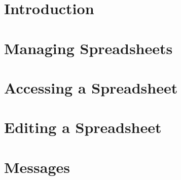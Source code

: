 \documentclass[twoside,a4paper]{refart}
\title{\thetitle}
\author{
        Vijay Bajracharya   \\
        Nick Hayes\\
        Rohun Kaddu\\
        Mateo Lopez \\
        Carson Storm \\
        Adian Taylor
}
\date{}
\begin{document}
\maketitle

\begin{abstract}
        
\end{abstract}

\tableofcontents

\newpage


\section{Introduction}



\section{Managing Spreadsheets}



\section{Accessing a Spreadsheet}



\section{Editing a Spreadsheet}



\section{Messages}


\end{document}
